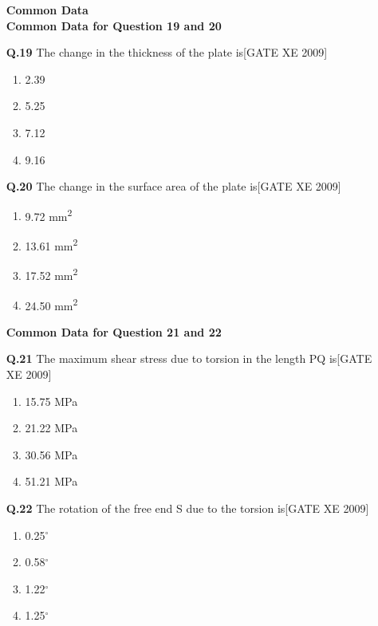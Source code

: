 \documentclass[journal,12pt,onecolumn]{IEEEtran}
\theoremstyle{remark}
\begin{document}
\begin{enumerate}
{\Large \textbf{{Common Data}}}\\
\textbf{Common Data for Question 19 and 20}
\item [\textbf{Q.19}] The change in the thickness of the plate is\hfill[GATE XE 2009]
\begin{multicols}{2}
\begin{enumerate}
    \item 2.39 
    \item 5.25 
    \item 7.12 
    \item 9.16 
\end{enumerate}
\end{multicols}

\vspace{0.3cm}

\item[ \textbf{Q.20}] The change in the surface area of the plate is\hfill[GATE XE 2009]
\begin{multicols}{2}
\begin{enumerate}
    \item 9.72 mm\textsuperscript{2}
    \item 13.61 mm\textsuperscript{2}
    \item 17.52 mm\textsuperscript{2}
    \item 24.50 mm\textsuperscript{2}
\end{enumerate}
\end{multicols}

\vspace{0.3cm}

\textbf{Common Data for Question 21 and 22}

\item[ \textbf{Q.21}] The maximum shear stress due to torsion in the length PQ is\hfill[GATE XE 2009]
\begin{multicols}{2}
\begin{enumerate}
    \item 15.75 MPa
    \item 21.22 MPa
    \item 30.56 MPa
    \item 51.21 MPa
\end{enumerate}
\end{multicols}

\item [\textbf{Q.22}] The rotation of the free end S due to the torsion is\hfill[GATE XE 2009]
\begin{multicols}{2}
\begin{enumerate}
    \item 0.25$^\circ$
    \item 0.58$^\circ$
    \item 1.22$^\circ$
    \item 1.25$^\circ$
\end{enumerate}
\end{multicols}


\end{enumerate}
\end{document}
